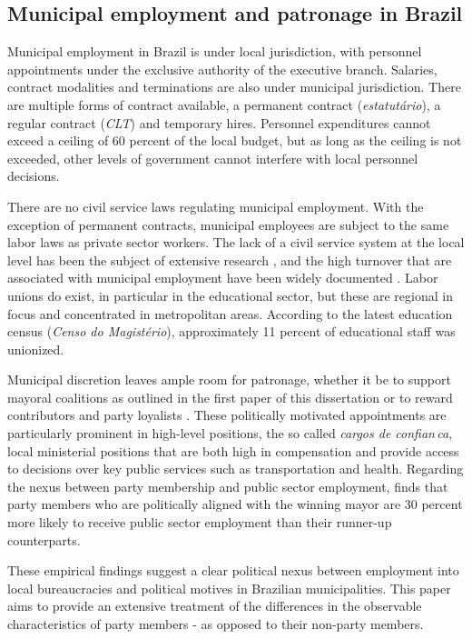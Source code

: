 \subsection{Municipal employment and patronage in Brazil}

Municipal employment in Brazil is under local jurisdiction, with personnel appointments under the exclusive authority of the executive branch. Salaries, contract modalities and terminations are also under municipal jurisdiction. There are multiple forms of contract available, a permanent contract (\emph{estatut\'{a}rio}), a regular contract (\emph{CLT}) and temporary hires. Personnel expenditures cannot exceed a ceiling of 60 percent of the local budget, but as long as the ceiling is not exceeded, other levels of government cannot interfere with local personnel decisions.

There are no civil service laws regulating municipal employment. With the exception of permanent contracts, municipal employees are subject to the same labor laws as private sector workers. The lack of a civil service system at the local level has been the subject of extensive research \citep{souza2004governos}, and the high turnover that are associated with municipal employment have been widely documented \citep{akhtari2017political}. Labor unions do exist, in particular in the educational sector, but these are regional in focus and concentrated in metropolitan areas. According to the latest education census (\emph{Censo do Magist\'{e}rio}), approximately 11 percent of educational staff was unionized.

Municipal discretion leaves ample room for patronage, whether it be to support mayoral coalitions as outlined in the first paper of this dissertation or to reward contributors and party loyalists \citep{colonnelli2018patronage,brollo2017victor}. These politically motivated appointments are particularly prominent in high-level positions, the so called \emph{cargos de confian\,{c}a}, local ministerial positions that are both high in compensation and provide access to decisions over key public services such as transportation and health. Regarding the nexus between party membership and public sector employment, \citet{brollo2017victor} finds that party members who are politically aligned with the winning mayor are 30 percent more likely to receive public sector employment than their runner-up counterparts.

These empirical findings suggest a clear political nexus between employment into local bureaucracies and political motives in Brazilian municipalities. This paper aims to provide an extensive treatment of the differences in the observable characteristics of party members - as opposed to their non-party members.

